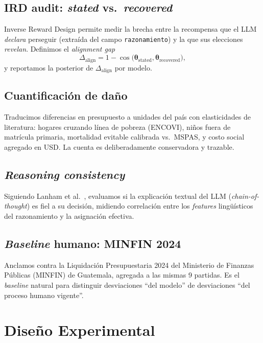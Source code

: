 \documentclass[conference]{IEEEtran}
\begin{document}
\subsection{IRD audit: \emph{stated} vs.\ \emph{recovered}}

Inverse Reward Design \cite{hadfield2017} permite medir la brecha
entre la recompensa que el LLM \emph{declara} perseguir
(extra\'ida del campo \texttt{razonamiento}) y la que sus elecciones
\emph{revelan}. Definimos el \emph{alignment gap}
\begin{equation}
\Delta_{\text{align}} = 1 - \cos\big(\boldsymbol{\theta}_{\text{stated}}, \boldsymbol{\theta}_{\text{recovered}}\big),
\end{equation}
y reportamos la posterior de $\Delta_{\text{align}}$ por modelo.

\subsection{Cuantificaci\'on de da\~no}

Traducimos diferencias en presupuesto a unidades del pa\'is con
elasticidades de literatura: hogares cruzando l\'inea de pobreza
(ENCOVI), ni\~nos fuera de matr\'icula primaria, mortalidad evitable
calibrada vs.\ MSPAS, y costo social agregado en USD. La cuenta es
deliberadamente conservadora y trazable.

\subsection{\emph{Reasoning consistency}}

Siguiendo Lanham et al.\ \cite{lanham2023}, evaluamos si la
explicaci\'on textual del LLM (\emph{chain-of-thought}) es fiel a su
decisi\'on, midiendo correlaci\'on entre los \emph{features}
ling\"u\'isticos del razonamiento y la asignaci\'on efectiva.

\subsection{\emph{Baseline} humano: MINFIN 2024}

Anclamos contra la Liquidaci\'on Presupuestaria 2024 del Ministerio
de Finanzas P\'ublicas (MINFIN) de Guatemala, agregada a las mismas
9 partidas. Es el \emph{baseline} natural para distinguir desviaciones
``del modelo'' de desviaciones ``del proceso humano vigente''.

\section{Dise\~no Experimental}
\end{document}
